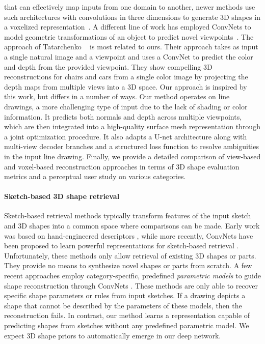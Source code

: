 \documentclass[10pt, conference, compsocconf]{IEEEtran}
\begin{document}
that can effectively map inputs from one domain to another, newer methods use such architectures  with convolutions in three dimensions to generate 3D shapes in a voxelized representation~\cite{wu2016learning,choy20163d,yan2016perspective,Hane17,Riegler17,Tatarchenko17}. A different line of work has employed ConvNets to model geometric transformations of an object to predict novel viewpoints~\cite{dosovitskiy2015learning,tatarchenko2015single,yang2015weakly,zhou2016view}. The approach of Tatarchenko \etal~\cite{tatarchenko2016multi} is most related to ours. Their approach takes as input a single natural image and a viewpoint  and uses a ConvNet to predict the color and depth from the provided viewpoint. They show compelling 3D reconstructions for chairs and cars from a single color image by projecting the depth maps from multiple views into a 3D space. Our approach is inspired by this work, but differs in a number of ways. Our method operates on line drawings, a  more challenging type of input due to the lack of shading or color information. It predicts both normals and depth across multiple viewpoints, which are then integrated into a high-quality surface mesh representation 
through a joint optimization procedure. It also adapts a U-net architecture \cite{pix2pix2016} along with multi-view decoder branches and a structured loss function  to resolve ambiguities in the input line drawing. Finally, we provide a detailed comparison of view-based and voxel-based reconstruction approaches in terms of 3D shape evaluation metrics and a perceptual user study on various categories.
\vspace{-2mm}\paragraph{Sketch-based 3D shape retrieval}
Sketch-based retrieval methods typically transform features of the input sketch and 3D shapes into a common space where comparisons can be made. Early work was  based on hand-engineered descriptors  \cite{Funkhouser:2003:SEM,pu20052d,hou2006sketch,Lee:2008:SSC,eitz2010sketch,Xu13sig,Xie13,Schneider:2014:SCC,GuoSGP2016}, while more recently, ConvNets have been proposed to learn powerful representations for sketch-based retrieval \cite{su2015multi,wang2015sketch}. Unfortunately, these methods only allow retrieval of existing  3D  shapes or parts. They provide no means to synthesize novel shapes or parts from scratch. A few recent approaches employ category-specific, predefined \emph{parametric models} to guide shape reconstruction through ConvNets \cite{Nishida:2016:ISU,huang2017shape,HanGY17}. These methods are only able to recover specific shape parameters or rules from input sketches.  If a drawing  depicts a shape that cannot be described by the parameters of these models, then the reconstruction fails. In contrast, our method learns a representation capable of predicting shapes from sketches without any predefined parametric model. We expect 3D shape priors to automatically emerge in our deep network.
\end{document}

